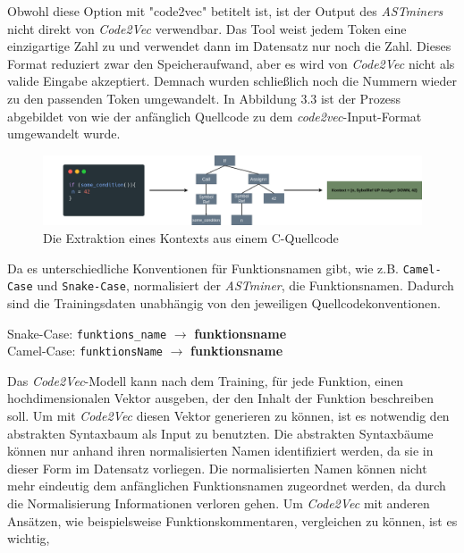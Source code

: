 \documentclass[12pt,letterpaper,ngerman]{article}
\begin{document}
Obwohl diese Option mit "code2vec" betitelt ist, ist der Output des
\textit{ASTminers} nicht direkt von \textit{Code2Vec} verwendbar.
Das Tool weist jedem Token eine
einzigartige Zahl zu und verwendet dann im Datensatz nur noch die Zahl.
Dieses Format reduziert zwar den Speicheraufwand, aber es wird von 
\textit{Code2Vec} nicht als valide Eingabe akzeptiert. Demnach
wurden schließlich noch die Nummern wieder zu den passenden
Token umgewandelt. In Abbildung 3.3 ist der Prozess abgebildet 
von wie der anfänglich Quellcode zu dem 
\textit{code2vec}-Input-Format
umgewandelt wurde.
\begin{figure}
  \begin{center}
    \includegraphics[scale=0.2]{abb/ast-extraction-example.drawio.png}
  \end{center}
  \caption{Die Extraktion eines Kontexts aus einem C-Quellcode}
\end{figure}
Da es unterschiedliche Konventionen für Funktionsnamen gibt, wie z.B.
\verb|Camel-Case| und \verb|Snake-Case|,
normalisiert der \textit{ASTminer},
die Funktionsnamen. Dadurch sind die Trainingsdaten unabhängig von den
jeweiligen Quellcodekonventionen.
\begin{example}
  \hfill
  \begin{center}
    Snake-Case: \verb|funktions_name| $\to$ {\bf funktions\text{\textbar}name }\\
    Camel-Case: \verb|funktionsName| $\to$ {\bf funktions\text{\textbar}name}
  \end{center}
\end{example}
Das \textit{Code2Vec}-Modell kann nach dem Training, für jede 
Funktion, einen hochdimensionalen
Vektor ausgeben, der den Inhalt der Funktion beschreiben soll.
Um mit \textit{Code2Vec} diesen Vektor generieren zu können, ist 
es notwendig den abstrakten Syntaxbaum als Input zu benutzten.
Die abstrakten Syntaxbäume können nur anhand 
ihren normalisierten Namen identifiziert werden, da sie
in dieser Form im Datensatz vorliegen. Die normalisierten Namen
können nicht mehr 
eindeutig dem anfänglichen Funktionsnamen zugeordnet werden, 
da durch die 
Normalisierung Informationen verloren gehen.
Um \textit{Code2Vec} mit anderen Ansätzen, wie beispielsweise 
Funktionskommentaren, vergleichen zu können, ist es wichtig,
\end{document}

